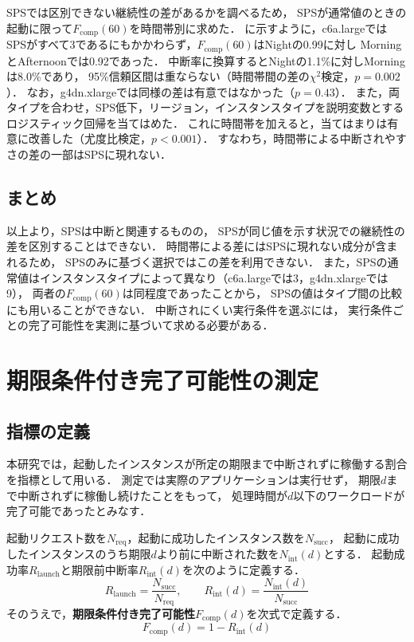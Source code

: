 \documentclass[submit,techrep,noauthor]{ipsj}
\newcommand{\Fcomp}{F_{\mathrm{comp}}}
\newcommand{\Rlaunch}{R_{\mathrm{launch}}}
\newcommand{\Rint}{R_{\mathrm{int}}}
\newcommand{\Nreq}{N_{\mathrm{req}}}
\newcommand{\Nsucc}{N_{\mathrm{succ}}}
\newcommand{\Nint}{N_{\mathrm{int}}}
\begin{document}
SPSでは区別できない継続性の差があるかを調べるため，
SPSが通常値のときの起動に限って$\Fcomp(60)$を時間帯別に求めた．
に示すように，c6a.largeでは
SPSがすべて3であるにもかかわらず，$\Fcomp(60)$はNightの0.99に対し
MorningとAfternoonでは0.92であった．
中断率に換算するとNightの1.1\%に対しMorningは8.0\%であり，
95\%信頼区間は重ならない（時間帯間の差の$\chi^2$検定，$p=0.002$）．
なお，g4dn.xlargeでは同様の差は有意ではなかった（$p=0.43$）．
また，両タイプを合わせ，SPS低下，リージョン，インスタンスタイプを説明変数とする
ロジスティック回帰を当てはめた．
これに時間帯を加えると，当てはまりは有意に改善した（尤度比検定，$p<0.001$）．
すなわち，時間帯による中断されやすさの差の一部はSPSに現れない．

\subsection{まとめ}

以上より，SPSは中断と関連するものの，
SPSが同じ値を示す状況での継続性の差を区別することはできない．
時間帯による差にはSPSに現れない成分が含まれるため，
SPSのみに基づく選択ではこの差を利用できない．
また，SPSの通常値はインスタンスタイプによって異なり（c6a.largeでは3，g4dn.xlargeでは9），
両者の$\Fcomp(60)$は同程度であったことから，
SPSの値はタイプ間の比較にも用いることができない．
中断されにくい実行条件を選ぶには，
実行条件ごとの完了可能性を実測に基づいて求める必要がある．


\section{期限条件付き完了可能性の測定}
\label{sec:measure}

\subsection{指標の定義}

本研究では，起動したインスタンスが所定の期限まで中断されずに稼働する割合を指標として用いる．
測定では実際のアプリケーションは実行せず，
期限$d$まで中断されずに稼働し続けたことをもって，
処理時間が$d$以下のワークロードが完了可能であったとみなす．

起動リクエスト数を$\Nreq$，起動に成功したインスタンス数を$\Nsucc$，
起動に成功したインスタンスのうち期限$d$より前に中断された数を$\Nint(d)$とする．
起動成功率$\Rlaunch$と期限前中断率$\Rint(d)$を次のように定義する．
\begin{equation}
\Rlaunch = \frac{\Nsucc}{\Nreq}, \qquad
\Rint(d) = \frac{\Nint(d)}{\Nsucc}
\end{equation}
そのうえで，\textbf{期限条件付き完了可能性}$\Fcomp(d)$を次式で定義する．
\begin{equation}
\Fcomp(d) = 1 - \Rint(d)
\label{eq:fcomp}
\end{equation}
\end{document}
